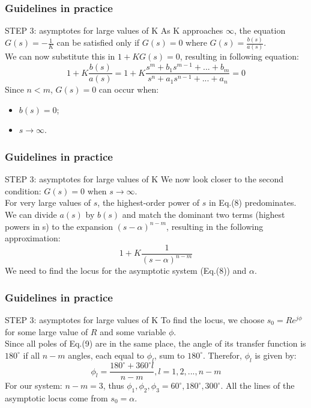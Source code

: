\begin{frame}
\frametitle{Guidelines in practice}
	\begin{block}{STEP 3: asymptotes for large values of K}
		As K approaches $\infty$, the equation $G(s) = -\frac{1}{K}$ can be satisfied only if $G(s) = 0$ where $G(s) = \frac{b(s)}{a(s)}$.\\
		\vspace{1em}
		We can now substitute this in $1 + KG(s) = 0$, resulting in following equation:
		\begin{equation}
		1 + K\frac{b(s)}{a(s)} = 1 + K\frac{s^m + b_1s^{m-1} + ... + b_m}{s^n + a_1s^{n-1} + ... + a_n} = 0
		\end{equation}
		Since $n < m$, $G(s) = 0$ can occur when: 
	\begin{itemize}
			\item $b(s) = 0$;
			\item $s \rightarrow \infty$.
		\end{itemize}
	\end{block}
\end{frame}

\begin{frame}
\frametitle{Guidelines in practice}
	\begin{block}{STEP 3: asymptotes for large values of K}
		We now look closer to the second condition: $G(s) = 0$ when $s \rightarrow \infty$.\\
		\vspace{1em}
		For very large values of $s$, the highest-order power of $s$ in Eq.(8) predominates. We can divide $a(s)$ by $b(s)$ and match the dominant two terms (highest powers in s) to the expansion $(s-\alpha)^{n-m}$, resulting in the following approximation:
		\begin{equation}
			1 + K\frac{1}{(s-\alpha)^{n-m}}
		\end{equation}
		We need to find the locus for the asymptotic system (Eq.(8)) and $\alpha$.
	\end{block}
\end{frame}

\begin{frame}
	\frametitle{Guidelines in practice}
	\begin{block}{STEP 3: asymptotes for large values of K}
		To find the locus, we choose $s_0 = Re^{j\phi}$ for some large value of $R$ and some variable $\phi$.\\
		\vspace{1em}
		Since all poles of Eq.(9) are in the same place, the angle of its transfer function is $180^{\circ}$ if all $n-m$ angles, each equal to $\phi_l$, sum to $180^{\circ}$. Therefor, $\phi_l$ is given by: 
		\begin{equation}
		\phi_l = \frac{180^{\circ} + 360^{\circ}l}{n-m}, l = 1,2,...,n-m
		\end{equation}
		For our system: $n-m=3$, thus $\phi_1, \phi_2, \phi_3 = 60^{\circ}, 180^{\circ}, 300^{\circ}$.
		All the lines of the asymptotic locus come from $s_0 = \alpha$.
	\end{block}
\end{frame}

